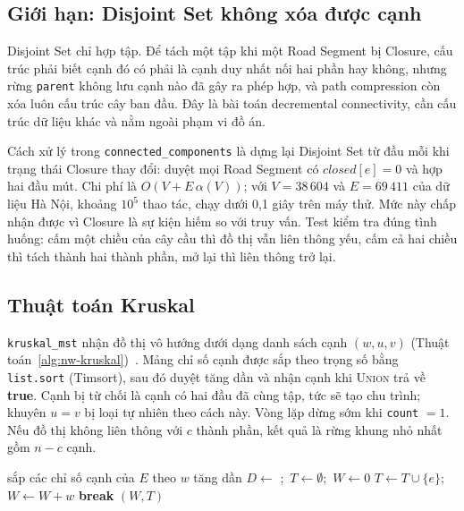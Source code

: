 \subsection{Giới hạn: Disjoint Set không xóa được cạnh}

Disjoint Set chỉ hợp tập. Để tách một tập khi một Road Segment bị Closure, cấu trúc phải biết cạnh đó có phải là cạnh duy nhất nối hai phần hay không, nhưng rừng \texttt{parent} không lưu cạnh nào đã gây ra phép hợp, và path compression còn xóa luôn cấu trúc cây ban đầu. Đây là bài toán decremental connectivity, cần cấu trúc dữ liệu khác và nằm ngoài phạm vi đồ án.

Cách xử lý trong \texttt{connected\_components} là dựng lại Disjoint Set từ đầu mỗi khi trạng thái Closure thay đổi: duyệt mọi Road Segment có $\mathit{closed}[e] = 0$ và hợp hai đầu mút. Chi phí là $O(V + E\,\alpha(V))$; với $V = 38\,604$ và $E = 69\,411$ của dữ liệu Hà Nội, khoảng $10^5$ thao tác, chạy dưới 0,1 giây trên máy thử. Mức này chấp nhận được vì Closure là sự kiện hiếm so với truy vấn. Test kiểm tra đúng tình huống: cấm một chiều của cây cầu thì đồ thị vẫn liên thông yếu, cấm cả hai chiều thì tách thành hai thành phần, mở lại thì liên thông trở lại.

\subsection{Thuật toán Kruskal}

\texttt{kruskal\_mst} nhận đồ thị vô hướng dưới dạng danh sách cạnh $(w, u, v)$ (Thuật toán~\ref{alg:nw-kruskal})~\cite{kruskal1956}. Mảng chỉ số cạnh được sắp theo trọng số bằng \texttt{list.sort} (Timsort), sau đó duyệt tăng dần và nhận cạnh khi \textsc{Union} trả về \textbf{true}. Cạnh bị từ chối là cạnh có hai đầu đã cùng tập, tức sẽ tạo chu trình; khuyên $u = v$ bị loại tự nhiên theo cách này. Vòng lặp dừng sớm khi \texttt{count} $=1$. Nếu đồ thị không liên thông với $c$ thành phần, kết quả là rừng khung nhỏ nhất gồm $n - c$ cạnh.

\begin{algorithm}[t]
\caption{Kruskal trên danh sách cạnh}
\label{alg:nw-kruskal}
\begin{algorithmic}[1]
  \State sắp các chỉ số cạnh của $E$ theo $w$ tăng dần
  \State $D \gets$ ;\ $T \gets \emptyset$;\ $W \gets 0$
     
      \State $T \gets T \cup \{e\}$;\ $W \gets W + w$
        \State \textbf{break}
      \EndIf
    \EndIf
  \EndFor
  \State \Return $(W, T)$
\EndFunction
\end{algorithmic}
\end{algorithm}

